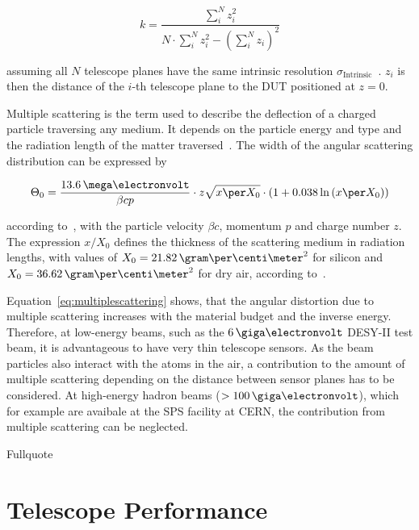\begin{equation}
k = \frac{\sum_i^N z_i^2}{N \cdot \sum_i^N z_i^2 - \left( \sum_i^N z_i
\right)^2}
\end{equation}

assuming all $N$ telescope planes have the same intrinsic resolution
$\sigma_{\textrm{Intrinsic}}$~\cite{ref:eudetreport200902}. 
$z_i$ is then the distance of the $i$-th telescope plane to the DUT positioned at $z=0$.

Multiple scattering is the term used to describe the deflection of a charged particle traversing any medium. 
It depends on the particle energy and type
and the radiation length of the matter traversed~\cite{ref:scatteringhighland}.
The width of the angular scattering distribution can be expressed by

\begin{equation}
\label{eq:multiplescattering}
\Theta_{0} = \frac{13.6\,\mega\electronvolt}{\beta c p} \cdot z
\sqrt{x \per X_0}
\cdot \left( 1 + 0.038 \ln{\left( x \per X_0\right) } \right)
\end{equation}

according to~\cite{ref:PDG-2014}, with the particle velocity $\beta c$, momentum $p$ and charge number $z$. 
The expression $x/X_0$ defines the thickness of the
scattering medium in radiation lengths, with values of $X_0 =
21.82\,\allowbreak\gram\per\centi\meter^2$ for silicon and $X_0 =
36.62\,\gram\per\centi\meter^2$ for dry air, according to~\cite{ref:x0values}.

Equation~\ref{eq:multiplescattering} shows, that the angular distortion due to
multiple scattering increases with the material budget and the inverse energy.
Therefore, at low-energy beams, such as the $6\,\giga\electronvolt$ DESY-II test
beam, it is advantageous to have very thin telescope sensors. 
As the beam particles also interact with the atoms in the air, a contribution to the amount
of multiple scattering depending on the distance between sensor planes has to be
considered. 
At high-energy hadron beams ($> 100\,\giga\electronvolt$), which for
example are avaibale at the SPS facility at CERN, the contribution from multiple
scattering can be neglected.





Fullquote~\cite{ref:thomas}
\bigskip


\section{Telescope Performance}\label{sec:telescoperesolution}

